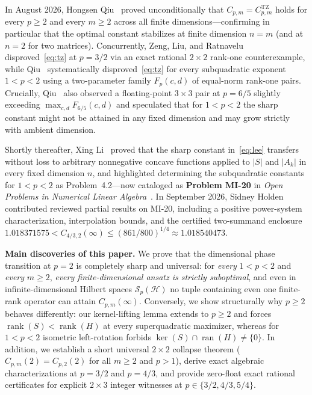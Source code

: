 \documentclass[10pt,letterpaper]{article}
\newcommand{\Hilb}{\mathcal{H}}
\newcommand{\Sp}{\mathcal{S}_p}
\newcommand{\ran}{\operatorname{ran}}
\newcommand{\rank}{\operatorname{rank}}
\newcommand{\TZ}{\mathrm{TZ}}
\begin{document}
In August 2026, Hongsen Qiu~\cite{Qiu2026} proved unconditionally that $C_{p,m} = C_{p,m}^{\TZ}$ holds for every $p \ge 2$ and every $m \ge 2$ across all finite dimensions—confirming in particular that the optimal constant stabilizes at finite dimension $n = m$ (and at $n = 2$ for two matrices). Concurrently, Zeng, Liu, and Ratnavelu~\cite{Zeng2026} disproved~\eqref{eq:tz} at $p = 3/2$ via an exact rational $2\times 2$ rank-one counterexample, while Qiu~\cite{Qiu2026} systematically disproved~\eqref{eq:tz} for every subquadratic exponent $1 < p < 2$ using a two-parameter family $F_p(c,d)$ of equal-norm rank-one pairs. Crucially, Qiu~\cite[\S5]{Qiu2026} also observed a floating-point $3\times 3$ pair at $p = 6/5$ slightly exceeding $\max_{c,d} F_{6/5}(c,d)$ and speculated that for $1 < p < 2$ the sharp constant might not be attained in any fixed dimension and may grow strictly with ambient dimension.

Shortly thereafter, Xing Li~\cite{Li2026} proved that the sharp constant in~\eqref{eq:lee} transfers without loss to arbitrary nonnegative concave functions applied to $|S|$ and $|A_k|$ in every fixed dimension $n$, and highlighted determining the subquadratic constants for $1 < p < 2$ as Problem~4.2—now cataloged as \textbf{Problem MI-20} in \emph{Open Problems in Numerical Linear Algebra}~\cite{OpenProblemsNLA}. In September 2026, Sidney Holden~\cite{Holden2026} contributed reviewed partial results on MI-20, including a positive power-system characterization, interpolation bounds, and the certified two-summand enclosure $1.018371575 < C_{4/3,2}(\infty) \le (861/800)^{1/4} \approx 1.018540473$.

\medskip
\textbf{Main discoveries of this paper.}
We prove that the dimensional phase transition at $p = 2$ is completely sharp and universal: for \emph{every} $1 < p < 2$ and \emph{every} $m \ge 2$, \emph{every finite-dimensional ansatz is strictly suboptimal}, and even in infinite-dimensional Hilbert spaces $\Sp(\Hilb)$ no tuple containing even one finite-rank operator can attain $C_{p,m}(\infty)$. Conversely, we show structurally why $p \ge 2$ behaves differently: our kernel-lifting lemma extends to $p \ge 2$ and forces $\rank(S) < \rank(H)$ at every superquadratic maximizer, whereas for $1 < p < 2$ isometric left-rotation forbids $\ker(S) \cap \ran(H) \neq \{0\}$. In addition, we establish a short universal $2\times 2$ collapse theorem ($C_{p,m}(2) = C_{p,2}(2)$ for all $m \ge 2$ and $p > 1$), derive exact algebraic characterizations at $p = 3/2$ and $p = 4/3$, and provide zero-float exact rational certificates for explicit $2\times 3$ integer witnesses at $p \in \{3/2, 4/3, 5/4\}$.
\end{document}
